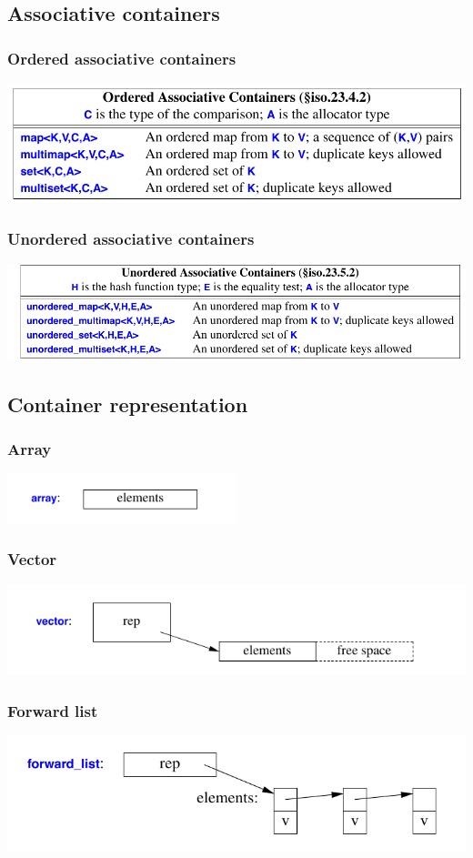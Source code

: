 \subsection{Associative containers}
\begin{frame}
  \frametitle{Ordered associative containers}
  \centering
  \includegraphics[width=\textwidth]{img/ordered.png}
\end{frame}
\begin{frame}
  \frametitle{Unordered associative containers}
  \centering
  \includegraphics[width=\textwidth]{img/unordered.png}
\end{frame}

\subsection{Container representation}
\begin{frame}
  \frametitle{Array}
  \centering
  \includegraphics[width=0.5\textwidth]{img/array.png}
\end{frame}

\begin{frame}
  \frametitle{Vector}
  \centering
  \includegraphics[width=\textwidth]{img/vector.png}
\end{frame}

\begin{frame}
  \frametitle{Forward list}
  \centering
  \includegraphics[width=\textwidth]{img/forward_list.png}
\end{frame}

